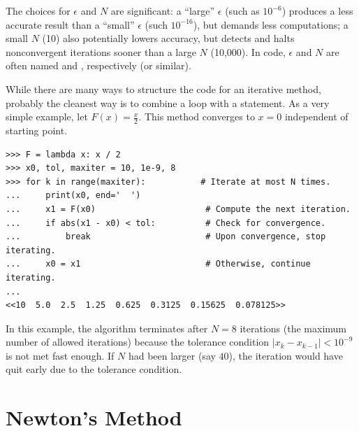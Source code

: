 The choices for $\epsilon$ and $N$ are significant: a ``large'' $\epsilon$ (such as $10^{-6}$) produces a less accurate result than a ``small'' $\epsilon$ (such $10^{-16}$), but demands less computations; a small $N$ (10) also potentially lowers accuracy, but detects and halts nonconvergent iterations sooner than a large $N$ (10,000).
In code, $\epsilon$ and $N$ are often named  and , respectively (or similar).

While there are many ways to structure the code for an iterative method, probably the cleanest way is to combine a  loop with a  statement.
As a very simple example, let $F(x) = \frac{x}{2}$.
This method converges to $x = 0$ independent of starting point.

\begin{lstlisting}
>>> F = lambda x: x / 2
>>> x0, tol, maxiter = 10, 1e-9, 8
>>> for k in range(maxiter):           # Iterate at most N times.
...     print(x0, end='  ')
...     x1 = F(x0)                      # Compute the next iteration.
...     if abs(x1 - x0) < tol:          # Check for convergence.
...         break                       # Upon convergence, stop iterating.
...     x0 = x1                         # Otherwise, continue iterating.
...
<<10  5.0  2.5  1.25  0.625  0.3125  0.15625  0.078125>>
\end{lstlisting}

In this example, the algorithm terminates after $N=8$ iterations (the maximum number of allowed iterations) because the tolerance condition $|x_k - x_{k-1}| < 10^{-9}$ is not met fast enough.
If $N$ had been larger (say $40$), the iteration would have quit early due to the tolerance condition.


\section*{Newton's Method} %

